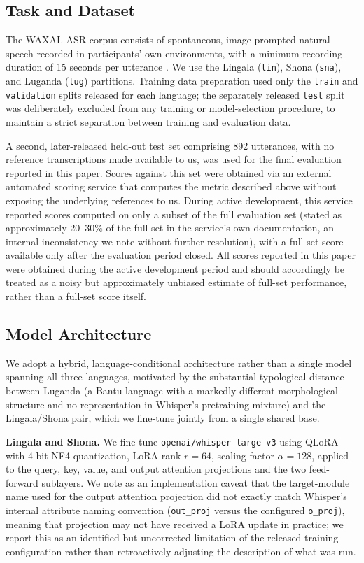 \documentclass[11pt]{article}
\begin{document}
\subsection{Task and Dataset}
\label{sec:task}

The WAXAL ASR corpus consists of spontaneous, image-prompted natural speech recorded in participants' own environments, with a minimum recording duration of 15 seconds per utterance \cite{diack2026waxal}. We use the Lingala (\texttt{lin}), Shona (\texttt{sna}), and Luganda (\texttt{lug}) partitions. Training data preparation used only the \texttt{train} and \texttt{validation} splits released for each language; the separately released \texttt{test} split was deliberately excluded from any training or model-selection procedure, to maintain a strict separation between training and evaluation data.

A second, later-released held-out test set comprising 892 utterances, with no reference transcriptions made available to us, was used for the final evaluation reported in this paper. Scores against this set were obtained via an external automated scoring service that computes the metric described above without exposing the underlying references to us. During active development, this service reported scores computed on only a subset of the full evaluation set (stated as approximately 20--30\% of the full set in the service's own documentation, an internal inconsistency we note without further resolution), with a full-set score available only after the evaluation period closed. All scores reported in this paper were obtained during the active development period and should accordingly be treated as a noisy but approximately unbiased estimate of full-set performance, rather than a full-set score itself.

\subsection{Model Architecture}
\label{sec:models}

We adopt a hybrid, language-conditional architecture rather than a single model spanning all three languages, motivated by the substantial typological distance between Luganda (a Bantu language with a markedly different morphological structure and no representation in Whisper's pretraining mixture) and the Lingala/Shona pair, which we fine-tune jointly from a single shared base.

\textbf{Lingala and Shona.} We fine-tune \texttt{openai/whisper-large-v3} \cite{radford2023whisper} using QLoRA \cite{dettmers2023qlora} with 4-bit NF4 quantization, LoRA rank $r=64$, scaling factor $\alpha=128$, applied to the query, key, value, and output attention projections and the two feed-forward sublayers. We note as an implementation caveat that the target-module name used for the output attention projection did not exactly match Whisper's internal attribute naming convention (\texttt{out\_proj} versus the configured \texttt{o\_proj}), meaning that projection may not have received a LoRA update in practice; we report this as an identified but uncorrected limitation of the released training configuration rather than retroactively adjusting the description of what was run.
\end{document}
